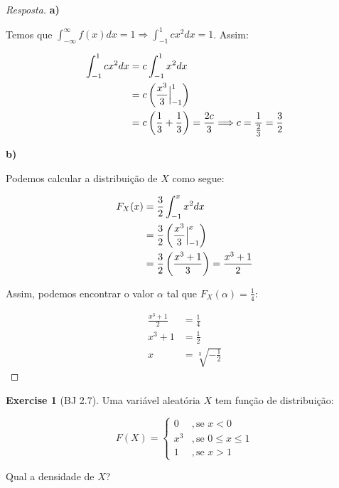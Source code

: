 \documentclass[
]{article}
\theoremstyle{definition}
\theoremstyle{definition}
\theoremstyle{definition}
\newtheorem{exercise}{Exercise}[section]
\theoremstyle{definition}
\theoremstyle{remark}
\begin{document}
\begin{proof}[Resposta]
\textbf{a)}

Temos que \(\int_{-\infty}^{\infty}f(x)dx = 1 \Rightarrow \int_{-1}^{1}cx^{2}dx = 1\). Assim:

\begin{align*}
\int_{-1}^{1}cx^{2}dx &= c\int_{-1}^{1}x^{2}dx \\
&= c\left(\frac{x^{3}}{3}\Big{|}_{-1}^{1}\right) \\
&= c\left(\frac{1}{3} + \frac{1}{3}\right) = \frac{2c}{3} \Longrightarrow c = \frac{1}{\frac{2}{3}} = \frac{3}{2}
\end{align*}

\textbf{b)}

Podemos calcular a distribuição de \(X\) como segue:

\begin{align*}
F_{X}(x) &= \frac{3}{2}\int_{-1}^{x}x^{2}dx \\
&= \frac{3}{2}\left(\frac{x^{3}}{3}\Big{|}_{-1}^{x}\right) \\
&= \frac{3}{2}\left(\frac{x^{3} + 1}{3}\right) = \frac{x^{3} + 1}{2}
\end{align*}

Assim, podemos encontrar o valor \(\alpha\) tal que \(F_{X}(\alpha) = \frac{1}{4}\):

\begin{align*}
\frac{x^{3} + 1}{2} &= \frac{1}{4} \\
x^{3} + 1 &= \frac{1}{2} \\
x &= \sqrt[3]{-\frac{1}{2}}
\end{align*}
\end{proof}

\begin{exercise}[BJ 2.7]
Uma variável aleatória \(X\) tem função de distribuição:

\begin{equation*}
F(X) = \begin{cases}
0 & ,\text{se }x<0 \\
x^{3} & ,\text{se }0 \le x \le 1 \\
1 & ,\text{se }x>1
\end{cases}
\end{equation*}

Qual a densidade de \(X\)?
\end{exercise}
\end{document}
